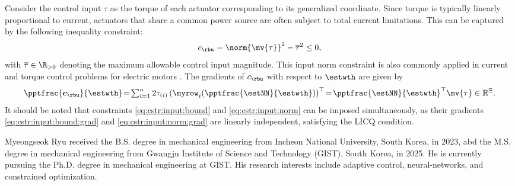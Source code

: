 \documentclass[lettersize,journal]{IEEEtran}
\newcommand*{\template}{template}
\begin{document}
Consider the control input $\tau$ as the torque of each actuator corresponding to its generalized coordinate. Since torque is typically linearly proportional to current, actuators that share a common power source are often subject to total current limitations. This can be captured by the following inequality constraint: 
\begin{equation}
    c_{\rbu}=\norm{\mv{\tau}}^2 -\overline\tau^2  \le 0
    ,
    \label{eq:cstr:input:norm}
\end{equation}
with $\overline\tau\in\R_{>0}$ denoting the maximum allowable control input magnitude. This input norm constraint is also commonly applied in current and torque control problems for electric motors \cite{Choi:2024aa}.
The gradients of $c_{\rbu}$ with respect to $\estwth$ are given by
\begin{equation}
    \pptfrac{\boldsymbol c_{\rbu}}{\estwth}
    \!=\! 
    \textstyle\sum_{i=1}^n 2\tau_{(i)} 
    \left(
        \myrow_i
        (
            \pptfrac{\estNN}{\estwth}
        )
    \right)^\top  
    \!=\! 
    {\pptfrac{\estNN}{\estwth}}^\top
    \mv{\tau}
    \in \mathbb R^{\Xi}.
    \label{eq:cstr:input:norm:grad}
\end{equation}
It should be noted that constraints \eqref{eq:cstr:input:bound} and \eqref{eq:cstr:input:norm} can be imposed simultaneously, as their gradients \eqref{eq:cstr:input:bound:grad} and \eqref{eq:cstr:input:norm:grad} are linearly independent, satisfying the LICQ condition.

\printbibliography


\begin{IEEEbiography}{Myeongseok Ryu}
    received the B.S. degree in mechanical engineering from Incheon National University, South Korea, in 2023, abd the M.S. degree in mechanical engineering from Gwangju Institute of Science and Technology (GIST), South Korea, in 2025. 
    He is currently pursuing the Ph.D. degree in mechanical engineering at GIST.
    His research interests include adaptive control, neural-networks, and constrained optimization.
\end{IEEEbiography}
\end{document}
